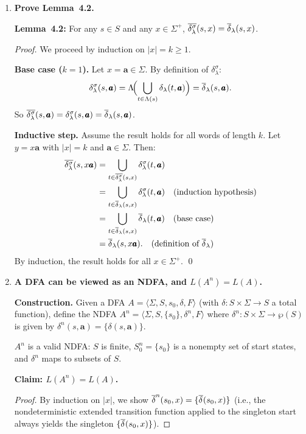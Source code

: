 \begin{enumerate}[{4.}1.]
\item \textbf{Prove Lemma~4.2.}

\textbf{Lemma~4.2:} For any $s\in S$ and any $x\in\Sigma^+$,
$\overline{\delta^{\sigma}_\lambda}(s,x)=\overline{\delta}_\lambda(s,x)$.

\begin{proof}
We proceed by induction on $|x|=k\ge 1$.

\textbf{Base case ($k=1$).}  Let $x=\pmb{a}\in\Sigma$.  By definition of
$\delta^{\sigma}_\lambda$:
\[
  \delta^{\sigma}_\lambda(s,\pmb{a})
  =\Lambda\!\Bigl(\bigcup_{t\in\Lambda(s)}\delta_\lambda(t,\pmb{a})\Bigr)
  =\overline{\delta}_\lambda(s,\pmb{a}).
\]
So $\overline{\delta^{\sigma}_\lambda}(s,\pmb{a})=\delta^{\sigma}_\lambda(s,\pmb{a})=\overline{\delta}_\lambda(s,\pmb{a})$.

\textbf{Inductive step.}  Assume the result holds for all words of length $k$.
Let $y=x\pmb{a}$ with $|x|=k$ and $\pmb{a}\in\Sigma$.  Then:
\begin{align*}
  \overline{\delta^{\sigma}_\lambda}(s,x\pmb{a})
  &= \bigcup_{t\in\overline{\delta^{\sigma}_\lambda}(s,x)}
      \delta^{\sigma}_\lambda(t,\pmb{a}) \\
  &= \bigcup_{t\in\overline{\delta}_\lambda(s,x)}
      \delta^{\sigma}_\lambda(t,\pmb{a}) \quad\text{(induction hypothesis)} \\
  &= \bigcup_{t\in\overline{\delta}_\lambda(s,x)}
      \overline{\delta}_\lambda(t,\pmb{a}) \quad\text{(base case)} \\
  &= \overline{\delta}_\lambda(s,x\pmb{a}).
    \quad\text{(definition of $\overline{\delta}_\lambda$)}
\end{align*}
By induction, the result holds for all $x\in\Sigma^+$. \qed
\end{proof}

\item \textbf{A DFA can be viewed as an NDFA, and $L(A^n)=L(A)$.}

\textbf{Construction.}  Given a DFA $A=\langle\Sigma,S,s_0,\delta,F\rangle$
(with $\delta:S\times\Sigma\to S$ a total function), define the NDFA
$A^n=\langle\Sigma,S,\{s_0\},\delta^n,F\rangle$ where
$\delta^n:S\times\Sigma\to\wp(S)$ is given by $\delta^n(s,\pmb{a})=\{\delta(s,\pmb{a})\}$.

$A^n$ is a valid NDFA: $S$ is finite, $S_0^n=\{s_0\}$ is a nonempty set of
start states, and $\delta^n$ maps to subsets of $S$.

\textbf{Claim: $L(A^n)=L(A)$.}

\begin{proof}
By induction on $|x|$, we show $\overline{\delta}^n(s_0,x)=\{\overline{\delta^{}}(s_0,x)\}$ (i.e., the
nondeterministic extended transition function applied to the singleton start
always yields the singleton $\{\overline{\delta^{}}(s_0,x)\}$).


\end{proof}
\end{enumerate}
